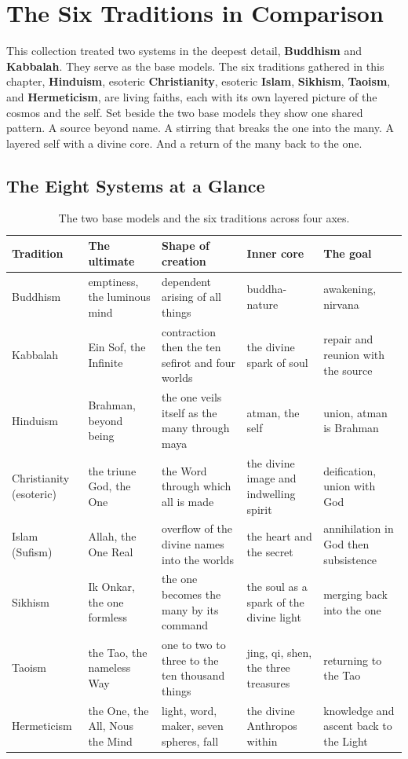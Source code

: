 \section{The Six Traditions in Comparison}

This collection treated two systems in the deepest detail, \textbf{Buddhism} and \textbf{Kabbalah}. They serve as the base models. The six traditions gathered in this chapter, \textbf{Hinduism}, esoteric \textbf{Christianity}, esoteric \textbf{Islam}, \textbf{Sikhism}, \textbf{Taoism}, and \textbf{Hermeticism}, are living faiths, each with its own layered picture of the cosmos and the self. Set beside the two base models they show one shared pattern. A source beyond name. A stirring that breaks the one into the many. A layered self with a divine core. And a return of the many back to the one.

\subsection{The Eight Systems at a Glance}

{\small
\begin{longtable}{L{2.4cm} L{3.1cm} L{3.1cm} L{2.6cm} L{2.6cm}}
\caption{The two base models and the six traditions across four axes.}\\
\toprule
\textbf{Tradition} & \textbf{The ultimate} & \textbf{Shape of creation} & \textbf{Inner core} & \textbf{The goal} \\
\midrule
Buddhism & emptiness, the luminous mind & dependent arising of all things & buddha-nature & awakening, nirvana \\
\addlinespace
Kabbalah & Ein Sof, the Infinite & contraction then the ten sefirot and four worlds & the divine spark of soul & repair and reunion with the source \\
\addlinespace
Hinduism & Brahman, beyond being & the one veils itself as the many through maya & atman, the self & union, atman is Brahman \\
\addlinespace
Christianity (esoteric) & the triune God, the One & the Word through which all is made & the divine image and indwelling spirit & deification, union with God \\
\addlinespace
Islam (Sufism) & Allah, the One Real & overflow of the divine names into the worlds & the heart and the secret & annihilation in God then subsistence \\
\addlinespace
Sikhism & Ik Onkar, the one formless & the one becomes the many by its command & the soul as a spark of the divine light & merging back into the one \\
\addlinespace
Taoism & the Tao, the nameless Way & one to two to three to the ten thousand things & jing, qi, shen, the three treasures & returning to the Tao \\
\addlinespace
Hermeticism & the One, the All, Nous the Mind & light, word, maker, seven spheres, fall & the divine Anthropos within & knowledge and ascent back to the Light \\
\bottomrule
\end{longtable}
}

